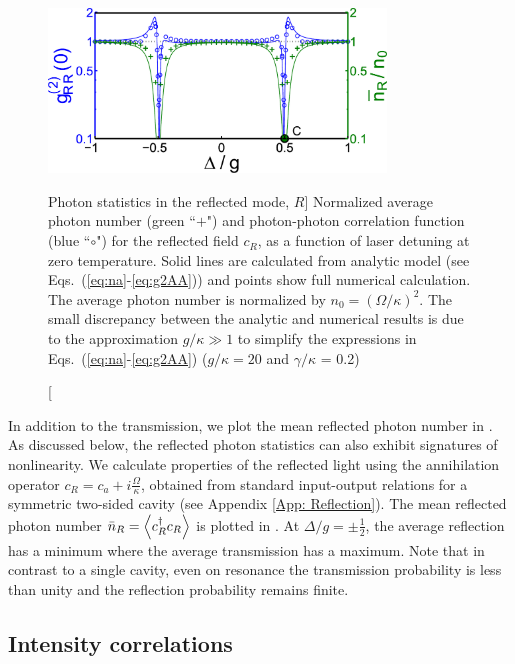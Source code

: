 \begin{figure}
\centering
  \includegraphics[width=0.8\textwidth]{./figs_Komar2013/fig2c.pdf}
  \caption
  [Photon statistics in the reflected mode, $R$]
  {
  \label{fig:spectrum_c}
  Normalized average photon number (green ``$+$")
  and photon-photon correlation function (blue ``$\circ$")
  for the reflected field $c_R$,
  as a function of laser detuning at zero temperature.
  Solid lines are calculated from analytic model
  (see Eqs.~(\ref{eq:na}-\ref{eq:g2AA}))
  and points show full numerical calculation.
  The average photon number is
  normalized by $n_0 = (\Omega/\kappa)^2$.
  The
  small discrepancy between the analytic and numerical results is due to the
  approximation $g/\kappa \gg 1$   to  
  simplify the expressions in Eqs.~(\ref{eq:na}-\ref{eq:g2AA})
  ($g/\kappa = 20$ and $\gamma/\kappa$ = 0.2)
  }
\end{figure}
 


In addition to the transmission,
we plot the mean reflected photon number
in  .
As discussed below, the reflected 
photon statistics
can also exhibit signatures of
nonlinearity.
We  calculate properties of the reflected light
using the
annihilation operator 
$c_R = c_a + i\frac{\Omega}{\kappa}$, obtained from standard input-output relations
for a symmetric two-sided cavity (see Appendix
\ref{App: Reflection}).
The mean reflected photon number
$\bar n_R = \left< c_R^\dagger c_R \right>$
is plotted in .
At $\Delta/g = \pm \frac{1}{2}$, 
the average reflection has a minimum where the
average transmission has a maximum. 
Note that in contrast to a single cavity, 
even on resonance the transmission probability
is less than unity and the reflection probability
remains finite.



\subsection{Intensity correlations}
\label{sec:onetime_correlation}

